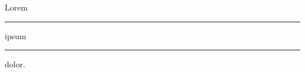 \documentclass{article}
\begin{document}
Lorem \rule[-2mm]{10mm}{4mm} ipsum \rule{5cm}{0.4mm} dolor.
\end{document}
